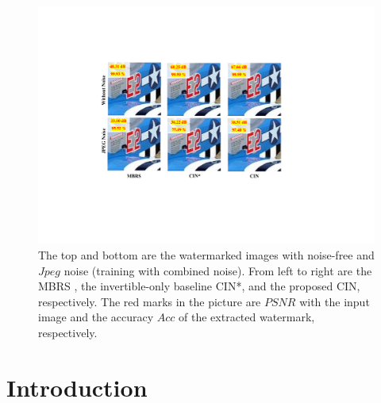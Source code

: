 \documentclass[sigconf]{acmart}
\begin{document}
\begin{figure}[H]
    \centering
    \includegraphics[width=1.0\linewidth]{picture/figure_for_first_page.pdf}
    \caption{
The top and bottom are the watermarked images with noise-free and $Jpeg$ noise (training with combined noise). From left to right are the MBRS \cite{jia2021mbrs}, the invertible-only baseline CIN*, and the proposed CIN, respectively. The red marks in the picture are $PSNR$ with the input image and the accuracy $Acc$ of the extracted watermark, respectively.
}
    \label{fig:first page}
\end{figure}




\section{Introduction}
\end{document}
